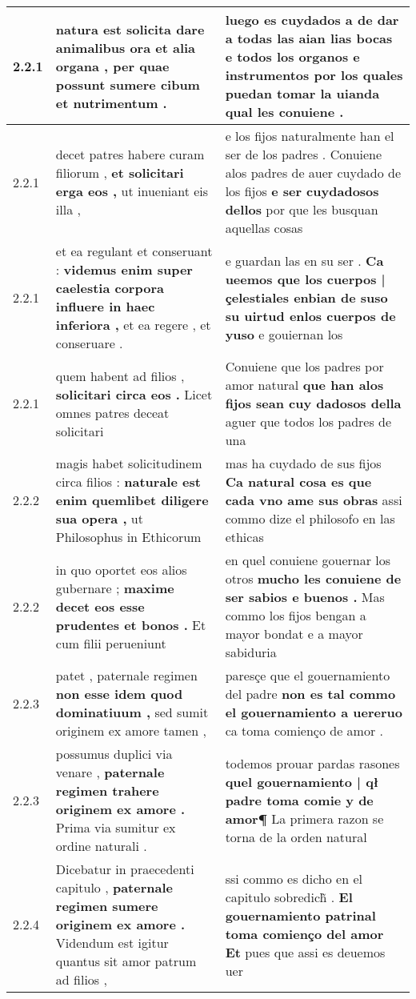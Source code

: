 \begin{tabular}{|p{1cm}|p{6.5cm}|p{6.5cm}|}
2.2.1 & natura est solicita \textbf{ dare animalibus ora et alia organa , } per quae possunt sumere cibum et nutrimentum . & luego es cuydados a de dar a todas las aian lias bocas \textbf{ e todos los organos e instrumentos } por los quales puedan tomar la uianda qual les conuiene . \\\hline
2.2.1 & decet patres habere curam filiorum , \textbf{ et solicitari erga eos , } ut inueniant eis illa , & e los fijos naturalmente han el ser de los padres . Conuiene alos padres de auer cuydado de los fijos \textbf{ e ser cuydadosos dellos } por que les busquan aquellas cosas \\\hline
2.2.1 & et ea regulant et conseruant : \textbf{ videmus enim super caelestia corpora influere in haec inferiora , } et ea regere , et conseruare . & e guardan las en su ser . \textbf{ Ca ueemos que los cuerpos | çelestiales enbian de suso su uirtud enlos cuerpos de yuso } e gouiernan los \\\hline
2.2.1 & quem habent ad filios , \textbf{ solicitari circa eos . } Licet omnes patres deceat solicitari & Conuiene que los padres por amor natural \textbf{ que han alos fijos sean cuy dadosos della } aguer que todos los padres de una \\\hline
2.2.2 & magis habet solicitudinem circa filios : \textbf{ naturale est enim quemlibet diligere sua opera , } ut Philosophus in Ethicorum & mas ha cuydado de sus fijos \textbf{ Ca natural cosa es que cada vno ame sus obras } assi commo dize el philosofo en las ethicas \\\hline
2.2.2 & in quo oportet eos alios gubernare ; \textbf{ maxime decet eos esse prudentes et bonos . } Et cum filii perueniunt & en quel conuiene gouernar los otros \textbf{ mucho les conuiene de ser sabios e buenos . } Mas commo los fijos bengan a mayor bondat e a mayor sabiduria \\\hline
2.2.3 & patet , paternale regimen \textbf{ non esse idem quod dominatiuum , } sed sumit originem ex amore tamen , & paresçe que el gouernamiento del padre \textbf{ non es tal commo el gouernamiento a uereruo } ca toma comienço de amor . \\\hline
2.2.3 & possumus duplici via venare , \textbf{ paternale regimen trahere originem ex amore . } Prima via sumitur ex ordine naturali . & todemos prouar pardas rasones \textbf{ quel gouernamiento | qł padre toma comie y de amor¶ } La primera razon se torna de la orden natural \\\hline
2.2.4 & Dicebatur in praecedenti capitulo , \textbf{ paternale regimen sumere originem ex amore . } Videndum est igitur quantus sit amor patrum ad filios , & ssi commo es dicho en el capitulo sobredich̃ . \textbf{ El gouernamiento patrinal toma comienço del amor Et } pues que assi es deuemos uer \\\hline

\end{tabular}
